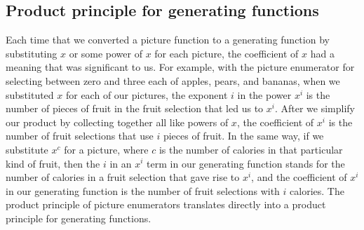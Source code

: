 \documentclass[10pt,]{book}
\theoremstyle{plain}
\theoremstyle{definition}
\numberwithin{equation}{chapter}
\begin{document}
\subsection[{Product principle for generating functions}]{Product principle for generating functions}\label{subsection-43}
Each time that we converted a picture function to a generating function by substituting \(x\) or some power of \(x\) for each picture, the coefficient of \(x\) had a meaning that was significant to us. For example, with the picture enumerator for selecting between zero and three each of apples, pears, and bananas, when we substituted \(x\) for each of our pictures, the exponent \(i\) in the power \(x^i\) is the number of pieces of fruit in the fruit selection that led us to \(x^i\). After we simplify our product by collecting together all like powers of \(x\), the coefficient of \(x^i\) is the number of fruit selections that use \(i\) pieces of fruit. In the same way, if we substitute \(x^c\) for a picture, where \(c\) is the number of calories in that particular kind of fruit, then the \(i\) in an \(x^i\) term in our generating function stands for the number of calories in a fruit selection that gave rise to \(x^i\), and the coefficient of \(x^i\) in our generating function is the number of fruit selections with \(i\) calories.  The product principle of picture enumerators translates directly into a product principle for generating functions.%
\end{document}
